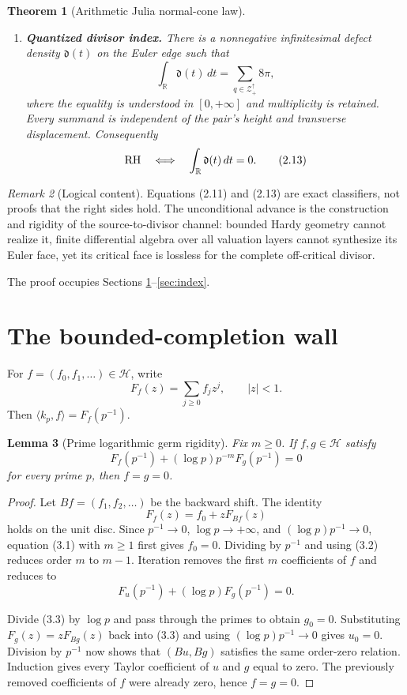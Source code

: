 \documentclass[11pt]{article}
\newtheorem{theorem}{Theorem}[section]
\newtheorem{lemma}[theorem]{Lemma}
\theoremstyle{definition}
\theoremstyle{remark}
\newtheorem{remark}[theorem]{Remark}
\newcommand{\R}{\mathbb R}
\newcommand{\cH}{\mathcal H}
\newcommand{\cZ}{\mathcal Z}
\begin{document}
\begin{theorem}[Arithmetic Julia normal-cone law]
\begin{enumerate}[label=\textup{(\Alph*)}]
\item \textbf{Quantized divisor index.}  There is a nonnegative infinitesimal defect density
\(\mathfrak d(t)\) on the Euler edge such that
\[
 \int_{\R}\mathfrak d(t)\,dt
 =\sum_{q\in\cZ_+^\uparrow}8\pi,                    \tag{2.12}
\]
where the equality is understood in \([0,+\infty]\) and multiplicity is retained.  Every
summand is independent of the pair's height and transverse displacement.  Consequently
\[
 {\rm RH}\quad\Longleftrightarrow\quad
 \int_{\R}\mathfrak d(t)\,dt=0.                     \tag{2.13}
\]
\end{enumerate}
\end{theorem}

\begin{remark}[Logical content]
Equations (2.11) and (2.13) are exact classifiers, not proofs that the right sides hold.  The
unconditional advance is the construction and rigidity of the source-to-divisor channel:
bounded Hardy geometry cannot realize it, finite differential algebra over all valuation layers
cannot synthesize its Euler face, yet its critical face is lossless for the complete off-critical
divisor.
\end{remark}

The proof occupies Sections \ref{sec:hardy}--\ref{sec:index}.

\section{The bounded-completion wall}\label{sec:hardy}

For \(f=(f_0,f_1,\ldots)\in\cH\), write
\[
 F_f(z)=\sum_{j\ge0}f_jz^j,\qquad |z|<1.
\]
Then \(\langle k_p,f\rangle=F_f(p^{-1})\).

\begin{lemma}[Prime logarithmic germ rigidity]\label{lem:germ-rigidity}
Fix \(m\ge0\).  If \(f,g\in\cH\) satisfy
\[
 F_f(p^{-1})+(\log p)p^{-m}F_g(p^{-1})=0           \tag{3.1}
\]
for every prime \(p\), then \(f=g=0\).
\end{lemma}

\begin{proof}
Let \(Bf=(f_1,f_2,\ldots)\) be the backward shift.  The identity
\[
 F_f(z)=f_0+zF_{Bf}(z)                              \tag{3.2}
\]
holds on the unit disc.  Since \(p^{-1}\to0\), \(\log p\to+\infty\), and
\((\log p)p^{-1}\to0\), equation (3.1) with \(m\ge1\) first gives \(f_0=0\).
Dividing by \(p^{-1}\) and using (3.2) reduces order \(m\) to \(m-1\).  Iteration removes the
first \(m\) coefficients of \(f\) and reduces to
\[
 F_u(p^{-1})+(\log p)F_g(p^{-1})=0.                 \tag{3.3}
\]

Divide (3.3) by \(\log p\) and pass through the primes to obtain \(g_0=0\).  Substituting
\(F_g(z)=zF_{Bg}(z)\) back into (3.3) and using
\((\log p)p^{-1}\to0\) gives \(u_0=0\).  Division by \(p^{-1}\) now shows that
\((Bu,Bg)\) satisfies the same order-zero relation.  Induction gives every Taylor coefficient
of \(u\) and \(g\) equal to zero.  The previously removed coefficients of \(f\) were already
zero, hence \(f=g=0\).
\end{proof}
\end{document}

